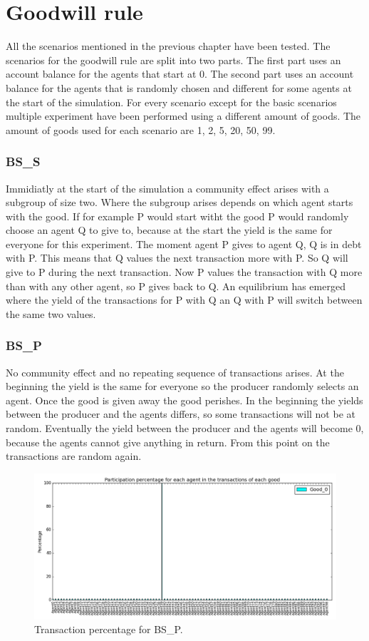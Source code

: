 \documentclass[twoside,openright]{uva-bachelor-thesis}
\begin{document}
\section{Goodwill rule}
All the scenarios mentioned in the previous chapter have been tested. The scenarios for the goodwill rule are split into two parts. The first part uses an account balance for the agents that start at 0. The second part uses an account balance for the agents that is randomly chosen and different for some agents at the start of the simulation. For every scenario except for the basic scenarios multiple experiment have been performed using a different amount of goods. The amount of goods used for each scenario are 1, 2, 5, 20, 50, 99.
\subsubsection{BS\_S}
Immidiatly at the start of the simulation a community effect arises with a subgroup of size two. Where the subgroup arises depends on which agent starts with the good. If for example P would start witht the good P would randomly choose an agent Q to give to, because at the start the yield is the same for everyone for this experiment. The moment agent P gives to agent Q, Q is in debt with P. This means that Q values the next transaction more with P. So Q will give to P during the next transaction. Now P values the transaction with Q more than with any other agent, so P gives back to Q. An equilibrium has emerged where the yield of the transactions for P with Q an Q with P will switch between the same two values. 

\subsubsection{BS\_P}
No community effect and no repeating sequence of transactions arises. At the beginning the yield is the same for everyone so the producer randomly selects an agent. Once the good is given away the good perishes. In the beginning the yields between the producer and the agents differs, so some transactions will not be at random. Eventually the yield between the producer and the agents will become 0, because the agents cannot give anything in return. From this point on the transactions are random again.
\begin{figure}[h!]
  \centering
   \includegraphics[scale=0.4]{Simulation2_figures/GR_BS_P/Figure1_4k}
  \caption{Transaction percentage for BS\_P.}
\end{figure}
\end{document}

